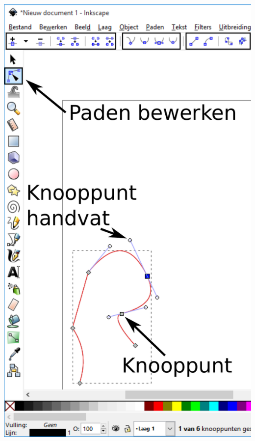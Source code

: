 \documentclass[t]{beamer}
\begin{document}
\begin{frame}
{\begin{columns}
\begin{column}[T]{0.4\textwidth}
					\includegraphics[height=0.8\textheight]{fig/inkscape_paden_bewerken}
				\end{column}
			\end{columns}
		}
\end{frame}
\end{document}
